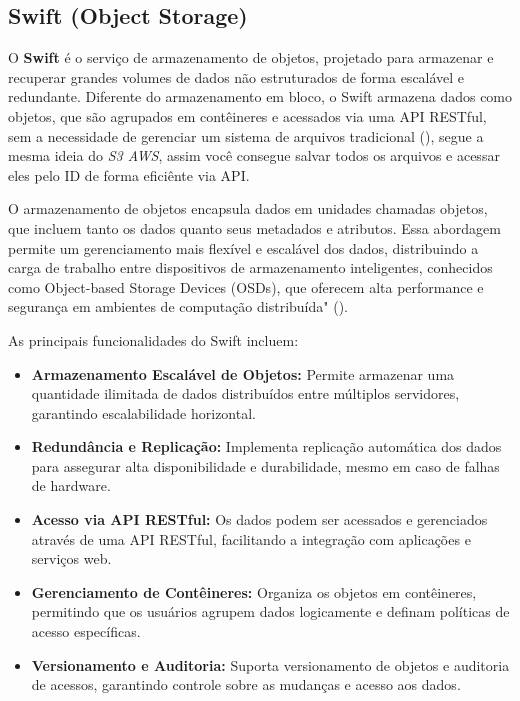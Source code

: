 \subsection{Swift (Object Storage)}

O \textbf{Swift} é o serviço de armazenamento de objetos, projetado para armazenar e recuperar grandes volumes de dados não estruturados de forma escalável e redundante. Diferente do armazenamento em bloco, o Swift armazena dados como objetos, que são agrupados em contêineres e acessados via uma API RESTful, sem a necessidade de gerenciar um sistema de arquivos tradicional (\cite{OpenStackSwitft}), segue a mesma ideia do \textit{S3 AWS}, assim você consegue salvar todos os arquivos e acessar eles pelo ID de forma eficiênte via API.

O armazenamento de objetos encapsula dados em unidades chamadas objetos, que incluem tanto os dados quanto seus metadados e atributos. Essa abordagem permite um gerenciamento mais flexível e escalável dos dados, distribuindo a carga de trabalho entre dispositivos de armazenamento inteligentes, conhecidos como Object-based Storage Devices (OSDs), que oferecem alta performance e segurança em ambientes de computação distribuída" (\cite{panasas2007object}).

As principais funcionalidades do Swift incluem:

\begin{itemize}
    \item \textbf{Armazenamento Escalável de Objetos:} Permite armazenar uma quantidade ilimitada de dados distribuídos entre múltiplos servidores, garantindo escalabilidade horizontal.
    \item \textbf{Redundância e Replicação:} Implementa replicação automática dos dados para assegurar alta disponibilidade e durabilidade, mesmo em caso de falhas de hardware.
    \item \textbf{Acesso via API RESTful:} Os dados podem ser acessados e gerenciados através de uma API RESTful, facilitando a integração com aplicações e serviços web.
    \item \textbf{Gerenciamento de Contêineres:} Organiza os objetos em contêineres, permitindo que os usuários agrupem dados logicamente e definam políticas de acesso específicas.
    \item \textbf{Versionamento e Auditoria:} Suporta versionamento de objetos e auditoria de acessos, garantindo controle sobre as mudanças e acesso aos dados.
\end{itemize}

